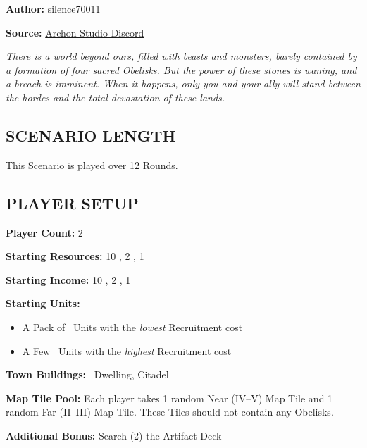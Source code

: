 
\begin{multicols}{2}

\textbf{Author:} silence70011

\textbf{Source:} \href{https://discord.com/channels/740870068178649108/1233112440322002964/1233112440322002964}{Archon Studio Discord}

\textit{There is a world beyond ours, filled with beasts and monsters, barely contained by a formation of four sacred Obelisks.
  But the power of these stones is waning, and a breach is imminent.
  When it happens, only you and your ally will stand between the hordes and the total devastation of these lands.
}

\subsection*{\MakeUppercase{Scenario Length}}

This Scenario is played over 12 Rounds.

\subsection*{\MakeUppercase{Player Setup}}

\textbf{Player Count:} 2

\textbf{Starting Resources:} 10 , 2 , 1 

\textbf{Starting Income:} 10 , 2 , 1 

\textbf{Starting Units:}
\begin{itemize}
  \item A Pack of \bronze\ Units with the \textit{lowest} Recruitment cost
  \item A Few \bronze\ Units with the \textit{highest} Recruitment cost
\end{itemize}

\textbf{Town Buildings:} \bronze\ Dwelling, Citadel

\textbf{Map Tile Pool:} Each player takes 1 random Near (IV--V) Map Tile and 1 random Far (II--III) Map Tile. These Tiles should not contain any Obelisks.

\textbf{Additional Bonus:} Search (2) the Artifact Deck

\vspace*{\fill}\columnbreak


\end{multicols}
